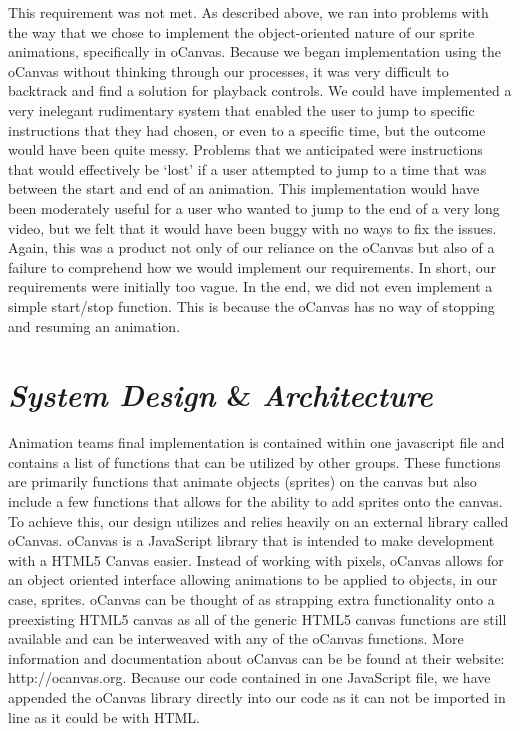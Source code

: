 \documentclass[12pt]{article}
\begin{document}
This requirement was not met. As described above, we ran into problems with the way that we chose to implement the object-oriented nature of our sprite animations, specifically in oCanvas. Because we began implementation using the oCanvas without thinking through our processes, it was very difficult to backtrack and find a solution for playback controls. We could have implemented a very inelegant rudimentary system that enabled the user to jump to specific instructions that they had chosen, or even to a specific time, but the outcome would have been quite messy. Problems that we anticipated were instructions that would effectively be `lost’ if a user attempted to jump to a time that was between the start and end of an animation. This implementation would have been moderately useful for a user who wanted to jump to the end of a very long video, but we felt that it would have been buggy with no ways to fix the issues. Again, this was a product not only of our reliance on the oCanvas but also of a failure to comprehend how we would implement our requirements. In short, our requirements were initially too vague. In the end, we did not even implement a simple start/stop function. This is because the oCanvas has no way of stopping and resuming an animation.




\section{\emph{\Large System Design} \Large \& \emph{\Large Architecture}}
Animation teams final implementation is contained within one javascript file and contains a list of functions that can be utilized by other groups. These functions are primarily functions that animate objects (sprites) on the canvas but also include a few functions that allows for the ability to add sprites onto the canvas. To achieve this, our design utilizes and relies heavily on an external library called oCanvas. oCanvas is a JavaScript library that is intended to make development with a HTML5 Canvas easier. Instead of working with pixels, oCanvas allows for an object oriented interface allowing animations to be applied to objects, in our case, sprites. oCanvas can be thought of as strapping extra functionality onto a preexisting HTML5 canvas as all of the generic HTML5 canvas functions are still available and can be interweaved with any of the oCanvas functions. More information and documentation about oCanvas can be be found at their website: http://ocanvas.org. Because our code contained in one JavaScript file, we have appended the oCanvas library directly into our code as it can not be imported in line as it could be with HTML. \\
\end{document}
